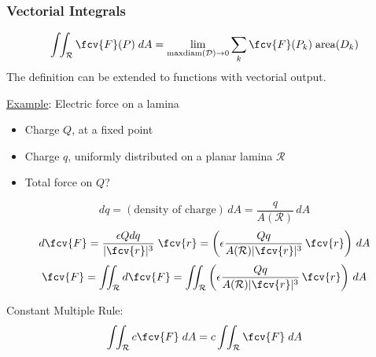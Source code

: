\begin{frame}
  \frametitle{Vectorial Integrals}

    $$\int\!\!\int_{\mathcal{R}} \fcv{F}(P) \; dA = \lim_{\text{maxdiam}(\mathcal{D}) \to 0} \sum_k \fcv{F}(P_k) \; \text{area}(D_k)$$
%
    The definition can be extended to functions with vectorial output.

\underline{Example}: Electric force on a lamina

    \begin{itemize}
      \item Charge $Q$, at a fixed point
      \item Charge $q$, uniformly distributed on a planar lamina $\mathcal{R}$
      \item Total force on $Q$?
    \end{itemize}
    $$dq = (\text{density of charge}) \, dA = \frac{q}{A(\mathcal{R})}\, dA$$
    $$d\fcv{F} = \frac{\epsilon Q dq}{|\fcv{r}|^3} \; \fcv{r}  =
    \left( \epsilon \frac{Q q}{A(\mathcal{R}) |\fcv{r}|^3} \, \fcv{r}\right)\, dA$$
    $$\fcv{F} = \int\!\!\!\int_{\mathcal{R}} d\fcv{F} =
    \int\!\!\!\int_{\mathcal{R}} \left( \epsilon \frac{Q q}{A(\mathcal{R}) |\fcv{r}|^3} \, \fcv{r}\right)\, dA$$

    \pause Constant Multiple Rule:
    $$\int\!\!\int_{\mathcal{R}} c \fcv{F} \; dA =
    c \int\!\!\int_{\mathcal{R}} \fcv{F} \; dA$$
\end{frame}